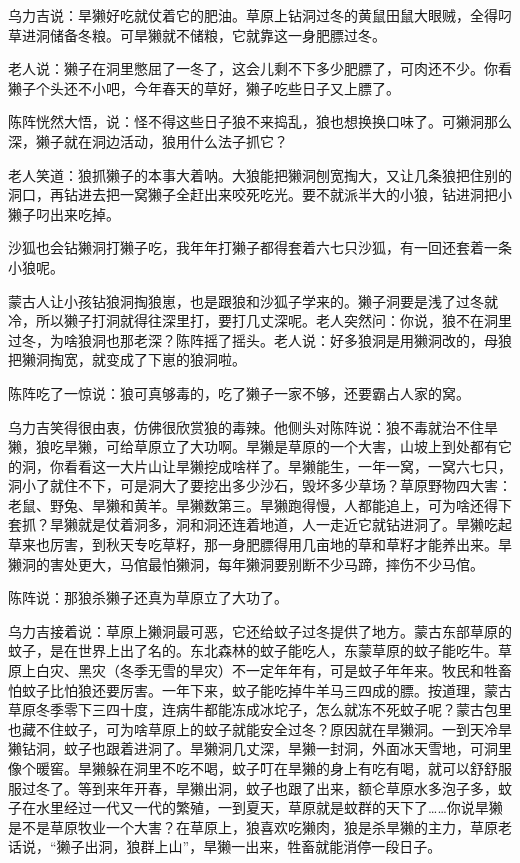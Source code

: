 \par 乌力吉说：旱獭好吃就仗着它的肥油。草原上钻洞过冬的黄鼠田鼠大眼贼，全得叼草进洞储备冬粮。可旱獭就不储粮，它就靠这一身肥膘过冬。
\par 老人说：獭子在洞里憋屈了一冬了，这会儿剩不下多少肥膘了，可肉还不少。你看獭子个头还不小吧，今年春天的草好，獭子吃些日子又上膘了。
\par 陈阵恍然大悟，说：怪不得这些日子狼不来捣乱，狼也想换换口味了。可獭洞那么深，獭子就在洞边活动，狼用什么法子抓它？
\par 老人笑道：狼抓獭子的本事大着呐。大狼能把獭洞刨宽掏大，又让几条狼把住别的洞口，再钻进去把一窝獭子全赶出来咬死吃光。要不就派半大的小狼，钻进洞把小獭子叼出来吃掉。
\par 沙狐也会钻獭洞打獭子吃，我年年打獭子都得套着六七只沙狐，有一回还套着一条小狼呢。
\par 蒙古人让小孩钻狼洞掏狼崽，也是跟狼和沙狐子学来的。獭子洞要是浅了过冬就冷，所以獭子打洞就得往深里打，要打几丈深呢。老人突然问：你说，狼不在洞里过冬，为啥狼洞也那老深？陈阵摇了摇头。老人说：好多狼洞是用獭洞改的，母狼把獭洞掏宽，就变成了下崽的狼洞啦。
\par 陈阵吃了一惊说：狼可真够毒的，吃了獭子一家不够，还要霸占人家的窝。
\par 乌力吉笑得很由衷，仿佛很欣赏狼的毒辣。他侧头对陈阵说：狼不毒就治不住旱獭，狼吃旱獭，可给草原立了大功啊。旱獭是草原的一个大害，山坡上到处都有它的洞，你看看这一大片山让旱獭挖成啥样了。旱獭能生，一年一窝，一窝六七只，洞小了就住不下，可是洞大了要挖出多少沙石，毁坏多少草场？草原野物四大害：老鼠、野兔、旱獭和黄羊。旱獭数第三。旱獭跑得慢，人都能追上，可为啥还得下套抓？旱獭就是仗着洞多，洞和洞还连着地道，人一走近它就钻进洞了。旱獭吃起草来也厉害，到秋天专吃草籽，那一身肥膘得用几亩地的草和草籽才能养出来。旱獭洞的害处更大，马倌最怕獭洞，每年獭洞要别断不少马蹄，摔伤不少马倌。
\par 陈阵说：那狼杀獭子还真为草原立了大功了。
\par 乌力吉接着说：草原上獭洞最可恶，它还给蚊子过冬提供了地方。蒙古东部草原的蚊子，是在世界上出了名的。东北森林的蚊子能吃人，东蒙草原的蚊子能吃牛。草原上白灾、黑灾（冬季无雪的旱灾）不一定年年有，可是蚊子年年来。牧民和牲畜怕蚊子比怕狼还要厉害。一年下来，蚊子能吃掉牛羊马三四成的膘。按道理，蒙古草原冬季零下三四十度，连病牛都能冻成冰坨子，怎么就冻不死蚊子呢？蒙古包里也藏不住蚊子，可为啥草原上的蚊子就能安全过冬？原因就在旱獭洞。一到天冷旱獭钻洞，蚊子也跟着进洞了。旱獭洞几丈深，旱獭一封洞，外面冰天雪地，可洞里像个暖窖。旱獭躲在洞里不吃不喝，蚊子叮在旱獭的身上有吃有喝，就可以舒舒服服过冬了。等到来年开春，旱獭出洞，蚊子也跟了出来，额仑草原水多泡子多，蚊子在水里经过一代又一代的繁殖，一到夏天，草原就是蚊群的天下了……你说旱獭是不是草原牧业一个大害？在草原上，狼喜欢吃獭肉，狼是杀旱獭的主力，草原老话说，“獭子出洞，狼群上山”，旱獭一出来，牲畜就能消停一段日子。
